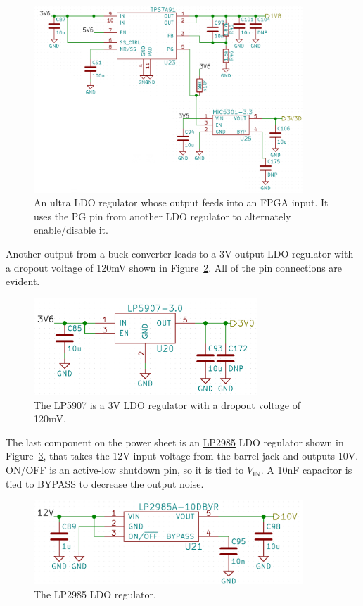 \begin{figure}[h]
        \centering
        \includegraphics[width=0.9\textwidth]{data/ldo-ldo-connection.png}
        \caption{An ultra LDO regulator whose output feeds into an FPGA input. It uses the PG
          pin from another LDO regulator to alternately enable/disable it.}
        \label{fig:ldo-ldo-connection}
\end{figure}

Another output from a buck converter leads to a 3V output LDO regulator with a dropout voltage of
120mV shown in Figure~\ref{fig:lp5907}. All of the pin connections are evident.

\begin{figure}[h]
        \centering
        \includegraphics[width=0.75\textwidth]{data/lp5907.png}
        \caption{The LP5907 is a 3V LDO regulator with a dropout voltage of 120mV.}
        \label{fig:lp5907}
\end{figure}

The last component on the power sheet is an
\href{http://www.ti.com/lit/ds/symlink/lp2985.pdf}{LP2985} LDO regulator shown in
Figure~\ref{fig:lp2985}, that takes the 12V input voltage from the barrel jack and outputs
10V. ON/OFF is an active-low shutdown pin, so it is tied to $V_{\text{IN}}$. A 10nF capacitor is
tied to BYPASS to decrease the output noise.

\begin{figure}[h]
        \centering
        \includegraphics[width=0.9\textwidth]{data/lp2985.png}
        \caption{The LP2985 LDO regulator.}
        \label{fig:lp2985}
\end{figure}